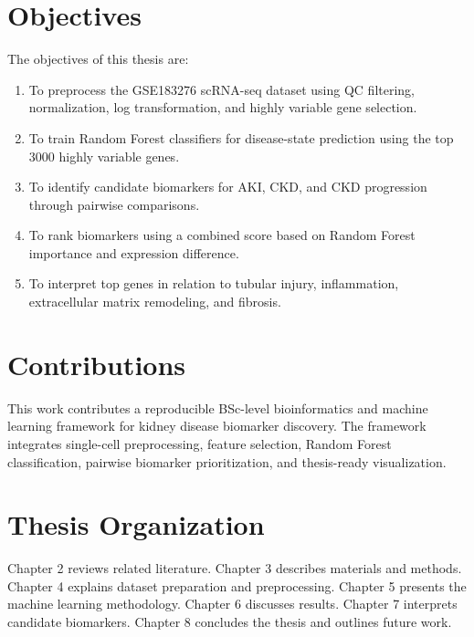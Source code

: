 \section{Objectives}
The objectives of this thesis are:
\begin{enumerate}[label=\arabic*.]
\item To preprocess the GSE183276 scRNA-seq dataset using QC filtering, normalization, log transformation, and highly variable gene selection.
\item To train Random Forest classifiers for disease-state prediction using the top 3000 highly variable genes.
\item To identify candidate biomarkers for AKI, CKD, and CKD progression through pairwise comparisons.
\item To rank biomarkers using a combined score based on Random Forest importance and expression difference.
\item To interpret top genes in relation to tubular injury, inflammation, extracellular matrix remodeling, and fibrosis.
\end{enumerate}

\section{Contributions}
This work contributes a reproducible BSc-level bioinformatics and machine learning framework for kidney disease biomarker discovery. The framework integrates single-cell preprocessing, feature selection, Random Forest classification, pairwise biomarker prioritization, and thesis-ready visualization.

\section{Thesis Organization}
Chapter 2 reviews related literature. Chapter 3 describes materials and methods. Chapter 4 explains dataset preparation and preprocessing. Chapter 5 presents the machine learning methodology. Chapter 6 discusses results. Chapter 7 interprets candidate biomarkers. Chapter 8 concludes the thesis and outlines future work.
